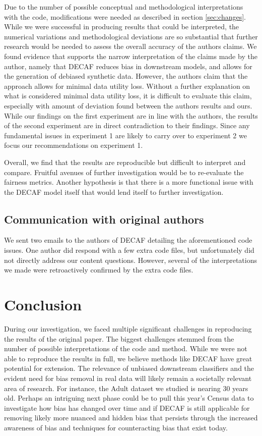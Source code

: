 Due to the number of possible conceptual and methodological interpretations with the code, modifications were needed as described in section \ref{sec:changes}. While we were successful in producing results that could be interpreted, the numerical variations and methodological deviations are so substantial that further research would be needed to assess the overall accuracy of the authors claims. We found evidence that supports the narrow interpretation of the claims made by the author, namely that DECAF reduces bias in downstream models, and allows for the generation of debiased synthetic data. However, the authors claim that the approach allows for minimal data utility loss. Without a further explanation on what is considered minimal data utility loss, it is difficult to evaluate this claim, especially with amount of deviation found between the authors results and ours. While our findings on the first experiment are in line with the authors, the results of the second experiment are in direct contradiction to their findings. Since any fundamental issues in experiment 1 are likely to carry over to experiment 2 we focus our recommendations on experiment 1. 

Overall, we find that the results are reproducible but difficult to interpret and compare. Fruitful avenues of further investigation would be to re-evaluate the fairness metrics. Another hypothesis is that there is a more functional issue with the DECAF model itself that would lend itself to further investigation.

\subsection{Communication with original authors}

We sent two emails to the authors of DECAF detailing the aforementioned code issues. One author did respond with a few extra code files, but unfortunately did not directly address our content questions. However, several of the interpretations we made were retroactively confirmed by the extra code files.

\section{Conclusion}

During our investigation, we faced multiple significant challenges in reproducing the results of the original paper. The biggest challenges stemmed from the number of possible interpretations of the code and method. While we were not able to reproduce the results in full, we believe methods like DECAF have great potential for extension. The relevance of unbiased downstream classifiers and the evident need for bias removal in real data will likely remain a societally relevant area of research. For instance, the Adult dataset\citep{Dua:2019} we studied is nearing 30 years old. Perhaps an intriguing next phase could be to pull this year's Census data to investigate how bias has changed over time and if DECAF is still applicable for removing likely more nuanced and hidden bias that persists through the increased awareness of bias and techniques for counteracting bias that exist today.
